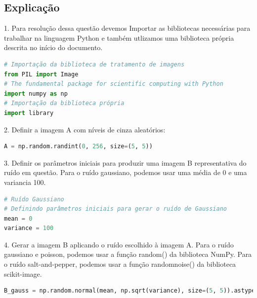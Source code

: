 \documentclass[10pt,a4paper]{article}
\begin{document}
\subsection{Explicação}

\begin{flushleft}
1. Para resolução dessa questão devemos  Importar as bibliotecas necessárias para trabalhar na linguagem Python e também utlizamos uma biblioteca própria descrita no início do documento.
\end{flushleft}

\begin{lstlisting}[language=Python]
# Importação da biblioteca de tratamento de imagens
from PIL import Image
# The fundamental package for scientific computing with Python
import numpy as np
# Importação da biblioteca própria
import library
\end{lstlisting}

\begin{flushleft}
2. Definir a imagem A com níveis de cinza aleatórios:
\end{flushleft}

\begin{lstlisting}[language=Python]
A = np.random.randint(0, 256, size=(5, 5))
\end{lstlisting}

\begin{flushleft}
3. Definir os parâmetros iniciais para produzir uma imagem B representativa do ruído em questão. Para o ruído gaussiano, podemos usar uma média de 0 e uma variancia 100. 
\end{flushleft}

\begin{lstlisting}[language=Python]
# Ruído Gaussiano
# Definindo parâmetros iniciais para gerar o ruído de Gaussiano
mean = 0
variance = 100
\end{lstlisting}

\begin{flushleft}
4. Gerar a imagem B aplicando o ruído escolhido à imagem A. Para o ruído gaussiano e poisson, podemos usar a função random() da biblioteca NumPy. Para o ruído salt-and-pepper, podemos usar a função random\textunderscore noise() da biblioteca scikit-image.
\end{flushleft}

\begin{lstlisting}[language=Python]
B_gauss = np.random.normal(mean, np.sqrt(variance), size=(5, 5)).astype(int)
\end{lstlisting}
\end{document}
